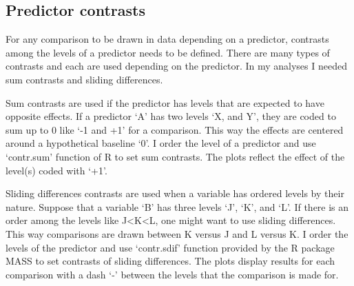 \subsection{Predictor contrasts}

For any comparison to be drawn in data depending on a predictor, contrasts among the levels of a predictor needs to be defined. There are many types of contrasts and each are used depending on the predictor. In my analyses I needed sum contrasts and sliding differences.

Sum contrasts are used if the predictor has levels that are expected to have opposite effects. If a predictor `A' has two levels `X, and Y', they are coded to sum up to 0 like `-1 and +1' for a comparison. This way the effects are centered around a hypothetical baseline `0'. I order the level of a predictor and use `contr.sum' function of R to set sum contrasts. The plots reflect the effect of the level(s) coded with `+1'.

Sliding differences contrasts are used when a variable has ordered levels by their nature. Suppose that a variable `B' has three levels `J’, `K’, and `L’. If there is an order among the levels like J<K<L, one might want to use sliding differences. This way comparisons are drawn between K versus J and L versus K. I order the levels of the predictor and use `contr.sdif’ function provided by the R package MASS \citep{mass2002} to set contrasts of sliding differences. The plots display results for each comparison with a dash `-' between the levels that the comparison is made for. 




